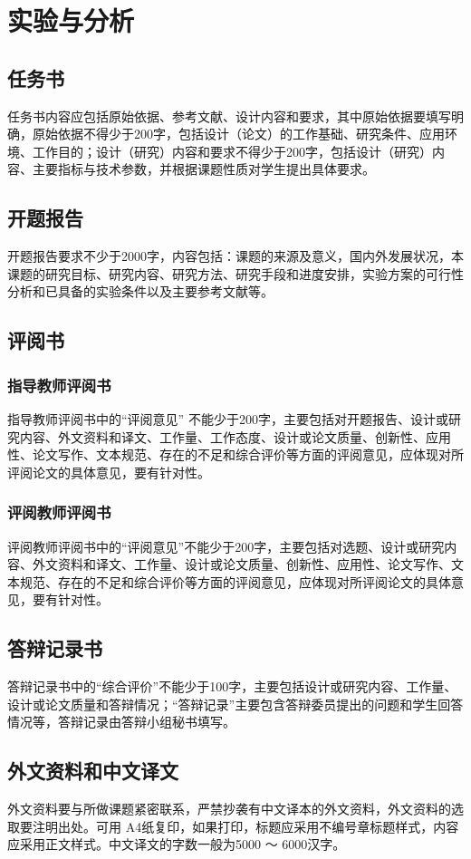 
\chapter{实验与分析}

\section{任务书}
任务书内容应包括原始依据、参考文献、设计内容和要求，其中原始依据要填写明确，原始依据不得少于200字，包括设计（论文）的工作基础、研究条件、应用环境、工作目的；设计（研究）内容和要求不得少于200字，包括设计（研究）内容、主要指标与技术参数，并根据课题性质对学生提出具体要求。

\section{开题报告}
开题报告要求不少于2000字，内容包括：课题的来源及意义，国内外发展状况，本课题的研究目标、研究内容、研究方法、研究手段和进度安排，实验方案的可行性分析和已具备的实验条件以及主要参考文献等。

\section{评阅书}

\subsection{指导教师评阅书}

指导教师评阅书中的“评阅意见” 不能少于200字，主要包括对开题报告、设计或研究内容、外文资料和译文、工作量、工作态度、设计或论文质量、创新性、应用性、论文写作、文本规范、存在的不足和综合评价等方面的评阅意见，应体现对所评阅论文的具体意见，要有针对性。

\subsection{评阅教师评阅书}

评阅教师评阅书中的“评阅意见”不能少于200字，主要包括对选题、设计或研究内容、外文资料和译文、工作量、设计或论文质量、创新性、应用性、论文写作、文本规范、存在的不足和综合评价等方面的评阅意见，应体现对所评阅论文的具体意见，要有针对性。

\section{答辩记录书}

答辩记录书中的“综合评价”不能少于100字，主要包括设计或研究内容、工作量、设计或论文质量和答辩情况；“答辩记录”主要包含答辩委员提出的问题和学生回答情况等，答辩记录由答辩小组秘书填写。

\section{外文资料和中文译文}

外文资料要与所做课题紧密联系，严禁抄袭有中文译本的外文资料，外文资料的选取要注明出处。可用 A4纸复印，如果打印，标题应采用不编号章标题样式，内容应采用正文样式。中文译文的字数一般为5000 ～ 6000汉字。

